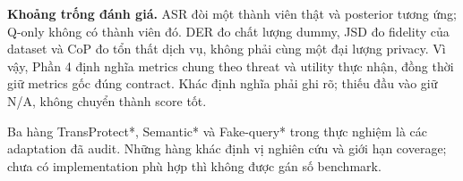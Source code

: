 \begin{footnotesize}\end{footnotesize}

\textbf{Khoảng trống đánh giá.} ASR đòi một thành viên thật và posterior tương ứng; Q-only không có thành viên
đó. DER đo chất lượng dummy, JSD đo fidelity của dataset và CoP đo tổn thất dịch vụ, không phải cùng một
đại lượng privacy. Vì vậy, Phần 4 định nghĩa metrics chung theo threat và utility thực nhận, đồng thời giữ
metrics gốc đúng contract. Khác định nghĩa phải ghi rõ; thiếu đầu vào giữ N/A, không chuyển thành score tốt.

Ba hàng TransProtect*, Semantic* và Fake-query* trong thực nghiệm là các adaptation đã audit. Những hàng
khác định vị nghiên cứu và giới hạn coverage; chưa có implementation phù hợp thì không được gán số benchmark.
